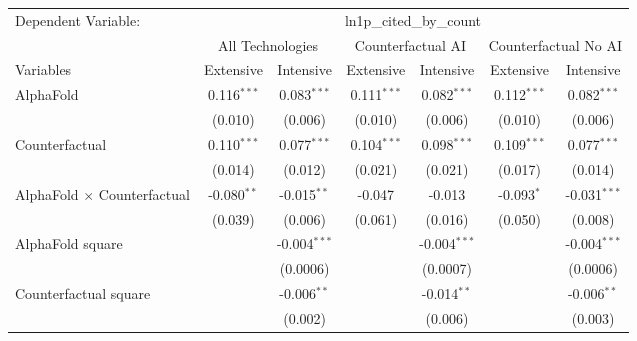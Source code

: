 \begingroup
\centering
\begin{tabular}{lcccccc}
   \tabularnewline \midrule \midrule
   Dependent Variable: & \multicolumn{6}{c}{ln1p\_cited\_by\_count}\\
 & \multicolumn{2}{c}{All Technologies} & \multicolumn{2}{c}{Counterfactual AI} & \multicolumn{2}{c}{Counterfactual No AI} \\
\cmidrule(lr){1-1}\cmidrule(lr){2-3} \cmidrule(lr){4-5} \cmidrule(lr){6-7}
Variables & \multicolumn{1}{c}{Extensive} & \multicolumn{1}{c}{Intensive} & \multicolumn{1}{c}{Extensive} & \multicolumn{1}{c}{Intensive} & \multicolumn{1}{c}{Extensive} & \multicolumn{1}{c}{Intensive} \\
\cmidrule(lr){1-1}\cmidrule(lr){2-2} \cmidrule(lr){3-3} \cmidrule(lr){4-4} \cmidrule(lr){5-5} \cmidrule(lr){6-6} \cmidrule(lr){7-7}
   AlphaFold                          & 0.116$^{***}$ & 0.083$^{***}$  & 0.111$^{***}$ & 0.082$^{***}$  & 0.112$^{***}$ & 0.082$^{***}$\\   
                                      & (0.010)       & (0.006)        & (0.010)       & (0.006)        & (0.010)       & (0.006)\\   
   Counterfactual                     & 0.110$^{***}$ & 0.077$^{***}$  & 0.104$^{***}$ & 0.098$^{***}$  & 0.109$^{***}$ & 0.077$^{***}$\\   
                                      & (0.014)       & (0.012)        & (0.021)       & (0.021)        & (0.017)       & (0.014)\\   
   AlphaFold $\times$ Counterfactual  & -0.080$^{**}$ & -0.015$^{**}$  & -0.047        & -0.013         & -0.093$^{*}$  & -0.031$^{***}$\\   
                                      & (0.039)       & (0.006)        & (0.061)       & (0.016)        & (0.050)       & (0.008)\\   
   AlphaFold square                   &               & -0.004$^{***}$ &               & -0.004$^{***}$ &               & -0.004$^{***}$\\   
                                      &               & (0.0006)       &               & (0.0007)       &               & (0.0006)\\   
   Counterfactual square              &               & -0.006$^{**}$  &               & -0.014$^{**}$  &               & -0.006$^{**}$\\   
                                      &               & (0.002)        &               & (0.006)        &               & (0.003)\\   

\end{tabular}
